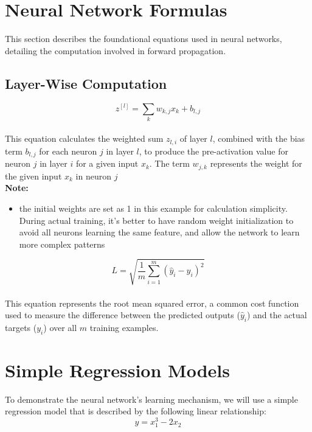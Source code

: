 \documentclass{article}
\begin{document}
\section{Neural Network Formulas}
This section describes the foundational equations used in neural networks, detailing the computation involved in forward propagation.

\subsection*{Layer-Wise Computation}
\begin{equation}
    z^{[l]} = \sum_{k} w_{k,j} x_k + b_{l,j}
\end{equation}
\\ This equation calculates the weighted sum $z_{l,i}$ of layer \(l\), combined with the bias term $b_{l,j}$ for each neuron \(j\) in layer \(l\),  to produce the pre-activation value for neuron \(j\) in layer \(i\) for a given input \(x_k\). The term $w_{j,k}$ represents the weight for the given input \(x_k\) in neuron \(j\)
\\

\noindent \textbf{Note:}
    \begin{itemize}
        \item the initial weights are set as 1 in this example for calculation simplicity. During actual training, it's better to have random weight initialization to avoid all neurons learning the same feature, and allow the network to learn more complex patterns
    \end{itemize}
    
\begin{equation}
    L = \sqrt{\frac{1}{m} \sum_{i=1}^m (\hat{y}_i - y_i)^2} 
\end{equation}
\\ This equation represents the root mean squared error, a common cost function used to measure the difference between the predicted outputs (\(\hat{y}_i\)) and the actual targets (\(y_i\)) over all \(m\) training examples.

\section{Simple Regression Models}
To demonstrate the neural network's learning mechanism, we will use a simple regression model that is described by the following linear relationship:
\begin{equation}
    y = x_1^3 - 2x_{2}
\end{equation}
\end{document}

